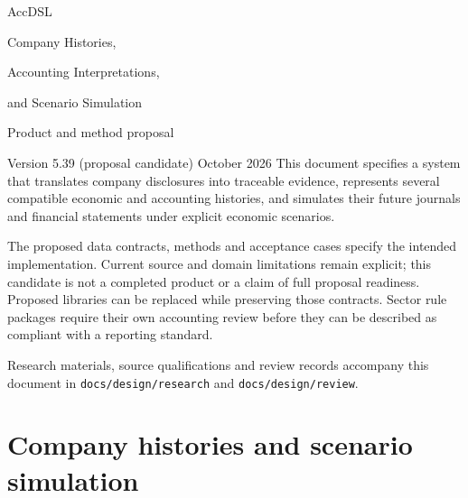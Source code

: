 \documentclass[11pt,a4paper]{report}
\newcommand{\code}[1]{\texttt{#1}}
\begin{document}
\hypersetup{pageanchor=false}
\begin{titlepage}
\vspace*{20mm}
{\sffamily\color{ink}\Huge AccDSL\par}
\vspace{7mm}
{\LARGE Company Histories,\par Accounting Interpretations,\par and Scenario Simulation\par}
\vspace{12mm}
{\Large Product and method proposal\par}
\vspace{5mm}
Version 5.39 (proposal candidate)  October 2026
\vfill
This document specifies a system that translates company disclosures into
traceable evidence, represents several compatible economic and accounting
histories, and simulates their future journals and financial statements under
explicit economic scenarios.

The proposed data contracts, methods and acceptance cases specify the intended
implementation. Current source and domain limitations remain explicit; this
candidate is not a completed product or a claim of full proposal readiness. Proposed libraries can be replaced while preserving those
contracts. Sector rule packages require their own accounting review before
they can be described as compliant with a reporting standard.

\vspace{8mm}
Research materials, source qualifications and review records accompany this
document in \code{docs/design/research} and \code{docs/design/review}.
\end{titlepage}
\hypersetup{pageanchor=true}
\tableofcontents
\clearpage{}
\part{Company histories and scenario simulation}


























\clearpage\label{sim:body-end}
\end{document}

